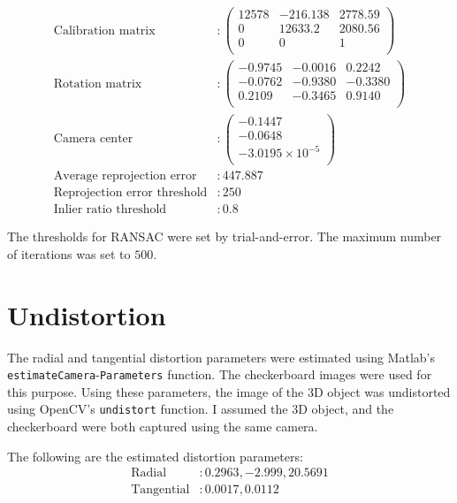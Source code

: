 \documentclass[a4paper,11pt]{article}
\begin{document}
    \begin{align*}
  \text{Calibration matrix}
  &:
  \begin{pmatrix}
  12578 & -216.138 & 2778.59 \\
  0 & 12633.2 & 2080.56 \\
  0 & 0 & 1 \\
  \end{pmatrix}\\
  \text{Rotation matrix}
  &:
  \begin{pmatrix}
   -0.9745 & -0.0016 & 0.2242 \\
   -0.0762 & -0.9380 & -0.3380 \\
   0.2109 & -0.3465 & 0.9140 \\
  \end{pmatrix}\\
  \text{Camera center}
  &:
  \begin{pmatrix}
   -0.1447\\
   -0.0648\\
   -3.0195\times10^{-5}\\
  \end{pmatrix}\\
  \text{Average reprojection error}
  &: 447.887\\
    \text{Reprojection error threshold}&: 250\\
  \text{Inlier ratio threshold}&: 0.8\
  \end{align*}
  
  The thresholds for RANSAC were set by trial-and-error. The maximum number of iterations was set to $500$.
 
 \section{Undistortion}
 
 The radial and tangential distortion parameters were estimated using Matlab's \texttt{estimateCamera}-\texttt{Parameters} function. The checkerboard images were used for this purpose. Using these parameters, the image of the 3D object was undistorted using OpenCV's \texttt{undistort} function. I assumed the 3D object, and the checkerboard were both captured using the same camera.
 
 The following are the estimated distortion parameters:
 \begin{align*}
  \text{Radial}&: 0.2963, -2.999,  20.5691\\
  \text{Tangential}&: 0.0017, 0.0112\\
 \end{align*}
 
\end{document}
